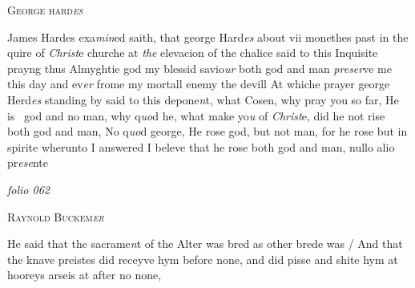 \documentclass[12pt, a4paper]{book}
\begin{document}
               
               	
				\begin{center}  {\scshape George hard\textit{es}
                  }  \end{center}
			
               	
               		
				\marginpar[\vspace{0.5cm}{\textcolor{Gray}{herecie}}]{}
			
               		
				\marginpar[\vspace{0.5cm}{\textcolor{Gray}{n}}]{}
			
               		
		\ifthenelse{\isodd{\thepage}}
		{\reversemarginpar}
		{\normalmarginpar}
		James Hardes exa\textit{min}ed saith, that george Hard\textit{es} about
 vii monethes past in the quire of \textit{Christ}e churche at \textit{the}
 elevacion of the chalice said to this Inquisite prayng thus
 Almyghtie god my blessid savio\textit{ur} both god and man \textit{preser}ve
 me this day and ev\textit{er} frome my mortall enemy the devill
 At whiche prayer george Herd\textit{es} standing by said to this
  depone\textit{n}t, what Cosen, why pray you so far, He is 
  god and no man, why q\textit{uo}d he, what make yo\textit{u }of \textit{Christ}e,
               			did he not rise both god and man, No q\textit{uo}d george, He
 rose god, but not man, for he rose but in spirite
 wherunto I answered I beleve that he rose both god
 and man, nullo alio pr\textit{ese}nte


               

\dotfill
					

\textit{folio 062}


               
                  
				\begin{center}  {\scshape Raynold Buckem\textit{er}
                  }  \end{center}
			
               	
               		
				\marginpar[\vspace{0.5cm}{\textcolor{Gray}{herecie}}]{}
			
			
		\ifthenelse{\isodd{\thepage}}
		{\reversemarginpar}
		{\normalmarginpar}
		He said that the sacrame\textit{n}t of the Alter was bred
  as other brede was / And that the knave preistes did
 receyve hym before none, and did pisse and shite hym
 at hooreys arseis at after no none,
               	
\end{document}
